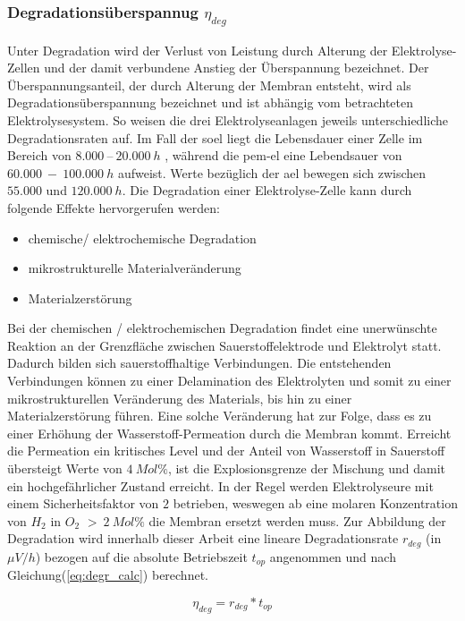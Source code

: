 \documentclass[onecolumn,10pt,titlepage]{article}
\begin{document}
			\subsubsection*{Degradationsüberspannug $\eta_{deg}$}
			Unter Degradation wird der Verlust von Leistung durch Alterung der Elektrolyse-Zellen und der damit verbundene Anstieg der Überspannung bezeichnet. Der Überspannungsanteil, der durch Alterung der Membran entsteht, wird als Degradationsüberspannung bezeichnet und ist abhängig vom betrachteten Elektrolysesystem. So weisen die drei Elektrolyseanlagen jeweils unterschiedliche Degradationsraten auf. Im Fall der \gls{soel} liegt die Lebensdauer einer Zelle im Bereich von $8.000 ~– ~20.000~h$ \cite{DeNiangThe.12.2015}, während die \gls{pem}-\gls{el} eine Lebendsauer von $60.000~ - ~100.000~h$ aufweist. Werte bezüglich der \gls{ael} bewegen sich zwischen $55.000$ und $120.000~h$.\cite{Buttler.2018} Die Degradation einer Elektrolyse-Zelle kann durch folgende Effekte hervorgerufen werden:
			\begin{itemize}
				\item chemische/ elektrochemische Degradation
				\item mikrostrukturelle Materialveränderung
				\item Materialzerstörung
			\end{itemize}
			Bei der chemischen / elektrochemischen Degradation findet eine unerwünschte Reaktion an der Grenzfläche zwischen Sauerstoffelektrode und Elektrolyt statt. Dadurch bilden sich sauerstoffhaltige Verbindungen. Die entstehenden Verbindungen können zu einer Delamination des Elektrolyten und somit zu einer mikrostrukturellen Veränderung des Materials, bis hin zu einer Materialzerstörung führen. Eine solche Veränderung hat zur Folge, dass es zu einer Erhöhung der Wasserstoff-Permeation durch die Membran kommt. Erreicht die Permeation ein kritisches Level und der Anteil von Wasserstoff in Sauerstoff übersteigt Werte von $4 ~Mol\%$, ist die Explosionsgrenze der Mischung und damit ein hochgefährlicher Zustand erreicht. In der Regel werden Elektrolyseure mit einem Sicherheitsfaktor von $2$ betrieben, weswegen ab eine molaren Konzentration von $H_2$ in $O_2$ $>~2~Mol\%$ die Membran ersetzt werden muss.\cite{Trinke2018}
			Zur Abbildung der Degradation wird innerhalb dieser Arbeit eine lineare Degradationsrate $r_{deg}$ (in $\mu V/h$) bezogen auf die absolute Betriebszeit $t_{op}$ angenommen und nach Gleichung(\ref{eq:degr_calc}) berechnet.
			
			\begin{equation}
				\eta_{deg} = r_{deg} * t_{op}
				\label{eq:degr_calc}
			\end{equation}	
			
\end{document}
